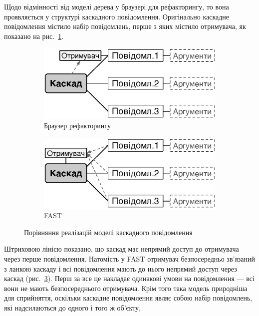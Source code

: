\documentclass[12pt,a4paper]{article}
\begin{document}
Щодо відмінності від моделі дерева у браузері для рефакторингу, то вона проявляється у структурі каскадного повідомлення. Оригінально каскадне повідомлення містило набір повідомлень, перше з яких містило отримувача, як показано на рис.~\ref{rbCascade}.
\begin{figure}[h]
        \vspace{\columnsep}
        \centering
        \begin{subfigure}[b]{0.45\textwidth}
                \centering
                \includegraphics[width=\textwidth]{rbCascade}
                \caption{Браузер рефакторингу\label{rbCascade}}
        \end{subfigure}
        \hspace{0.05\textwidth}
        \begin{subfigure}[b]{0.45\textwidth}
                \centering
                \includegraphics[width=\textwidth]{fastCascade}
                \caption{FAST\label{fastCascade}}
        \end{subfigure}
        \caption{Порівняння реалізацій моделі каскадного повідомлення}
\end{figure}
Штриховою лінією показано, що каскад має непрямий доступ до отримувача через перше повідомлення. Натомість у FAST отримувач безпосередньо зв'язаний з ланкою каскаду і всі повідомлення мають до нього непрямий доступ через каскад (рис.~\ref{fastCascade}). Перш за все це накладає одинакові умови на повідомлення --- всі вони не мають безпосереднього отримувача. Крім того така модель природніша для сприйняття, оскільки каскадне повідомлення являє собою набір повідомлень, які надсилаються до одного і того ж об'єкту,
\end{document}
